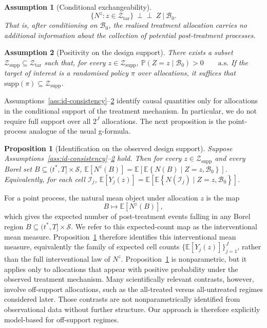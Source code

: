 \documentclass{statsoc}
\newtheorem{proposition}[proposition]{Proposition}
\newtheorem{assumption}[assumption]{Assumption}
\newcommand{\bbE}{\mathbb{E}}
\newcommand{\bbP}{\mathbb{P}}
\newcommand{\1}{\mathbbm{1}}
\newcommand{\Nproc}{N}
\begin{document}
\begin{assumption}[Conditional exchangeability]\label{ass:id-exchange}
\[
\{\Nproc^z:z\in\mathcal Z_{\mathrm{tar}}\}\ \perp\!\!\!\perp\ Z\ \big|\ \mathcal B_0.
\]
That is, after conditioning on \(\mathcal B_0\), the realised treatment allocation carries no additional information about the collection of potential post-treatment processes.
\end{assumption}

\begin{assumption}[Positivity on the design support]\label{ass:id-positivity}
There exists a subset \(\mathcal Z_{\mathrm{supp}}\subseteq \mathcal Z_{\mathrm{tar}}\) such that, for every \(z\in\mathcal Z_{\mathrm{supp}}\),
\(
\bbP(Z=z\mid \mathcal B_0)>0\qquad\text{a.s.}
\)
If the target of interest is a randomised policy \(\pi\) over allocations, it suffices that \(\mathrm{supp}(\pi)\subseteq \mathcal Z_{\mathrm{supp}}\).
\end{assumption}

Assumptions~\ref{ass:id-consistency}--\ref{ass:id-positivity} identify causal quantities only for allocations in the conditional support of the treatment mechanism. In particular, we do not require full support over all \(2^J\) allocations. The next proposition is the point-process analogue of the usual g-formula.

\begin{proposition}[Identification on the observed design support]\label{prop:id-onsupport}
Suppose Assumptions~\ref{ass:id-consistency}--\ref{ass:id-positivity} hold. Then for every \(z\in\mathcal Z_{\mathrm{supp}}\) and every Borel set \(B\subseteq (t^\ast,T]\times\mathcal S\),
\(
\bbE\!\left[\Nproc^z(B)\right]
=
\bbE\!\left[\bbE\!\left\{\Nproc(B)\mid Z=z,\mathcal B_0\right\}\right].
\)
Equivalently, for each cell \(\mathcal I_j\),
\(
\bbE\!\left[Y_j(z)\right]
=
\bbE\!\left[\bbE\!\left\{\Nproc(\mathcal I_j)\mid Z=z,\mathcal B_0\right\}\right].
\)
\end{proposition}


For a point process, the natural mean object under allocation \(z\) is the map
\[
B \mapsto \bbE[\Nproc^z(B)],
\]
which gives the expected number of post-treatment events falling in any Borel region \(B \subseteq (t^\ast,T]\times\mathcal S\). We refer to this expected-count map as the interventional mean measure. Proposition~\ref{prop:id-onsupport} therefore identifies this interventional mean measure, equivalently the family of expected cell counts \(\{\bbE[Y_j(z)]\}_{j=1}^J\), rather than the full interventional law of \(\Nproc^z\). Proposition~\ref{prop:id-onsupport} is nonparametric, but it applies only to allocations that appear with positive probability under the observed treatment mechanism. Many scientifically relevant contrasts, however, involve off-support allocations, such as the all-treated versus all-untreated regimes considered later. Those contrasts are not nonparametrically identified from observational data without further structure. Our approach is therefore explicitly model-based for off-support regimes.
\end{document}
